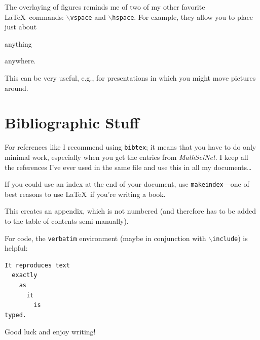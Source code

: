 The overlaying of figures reminds me of two of my other favorite \LaTeX \ commands: {\tt $\backslash$vspace} and {\tt $\backslash$hspace}. For example, they allow you to place
just about

\vspace{.5in}
\hspace{2in}
anything

\vspace{-.5in}
\hspace{5in}
anywhere.

\vspace{.5in}
\noindent
This can be very useful, e.g., for presentations in which you might move pictures around.


\section{Bibliographic Stuff}

For references like \cite[Section 2]{athanasiadismagic} I recommend using {\tt bibtex}; it means that you have to do only minimal work, especially when you get the entries
from \emph{MathSciNet}. I keep all the references I've ever used in the same file and use this in all my documents\dots

If you could use an index at the end of your document, use {\tt makeindex}---one of best reasons to use \LaTeX \ if you're writing a book.






This creates an appendix, which is not numbered (and therefore has to be added to the table of contents semi-manually).

For code, the {\tt verbatim} environment (maybe in conjunction with $\backslash${\tt include}) is helpful:

\begin{verbatim}
It reproduces text
  exactly
    as
      it
        is
typed.
\end{verbatim}

Good luck and enjoy writing!

